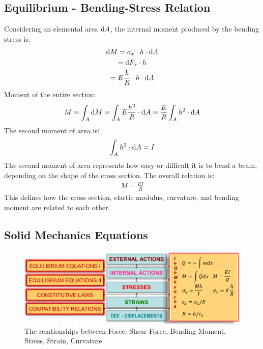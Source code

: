 \documentclass[class=report, crop=false, 12pt,a4paper]{standalone}
\begin{document}
\subsection{Equilibrium - Bending-Stress Relation}
Considering an elemental area $\dif A$, the internal moment produced by the bending stress is:
\begin{gather}
  \dif M = \sigma_x \cdot h \cdot \dif A \\
  = \dif F_x \cdot h \\
  = E\frac{h}{R} \cdot h \cdot \dif A
\end{gather}
Moment of the entire section:
\begin{gather}
  M = \int_{A}\dif M = \int_{A} E\frac{h^2}{R}\cdot \dif A = \frac{E}{R}\int_{A} h^2\cdot \dif A
\end{gather}
The second moment of area is:
\begin{gather}
  \int_{A} h^2\cdot \dif A = I
\end{gather}
The second moment of area represents how easy or difficult it is to bend a beam, depending on the shape of the cross section. The overall relation is:
\begin{gather}
  M = \frac{EI}{R}
\end{gather}
This defines how the cross section, elastic modulus, curvature, and bending moment are related to each other.
\subsection{Solid Mechanics Equations}
\begin{figure}[H]
  \centering
  \includegraphics[width = 0.8 \textwidth]{../img/solidmechanicsequations.PNG}
  \caption{The relationships between Force, Shear Force, Bending Moment, Stress, Strain, Curvature}
\end{figure}
\end{document}
